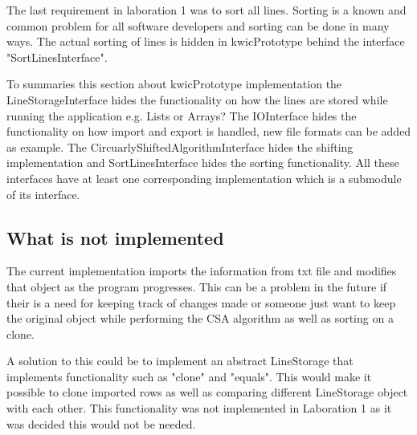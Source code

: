The last requirement in laboration 1 was to sort all lines. Sorting is a known and common
problem for all software developers and sorting can be done in many ways. The
actual sorting of lines is hidden in kwicPrototype behind the interface "SortLinesInterface".

To summaries this section about kwicPrototype implementation the LineStorageInterface
hides the functionality on how the lines are stored while running the application e.g. Lists or Arrays?
The IOInterface hides the functionality on how import and export is handled, new file
formats can be added as example. The CircuarlyShiftedAlgorithmInterface hides the
shifting implementation and SortLinesInterface hides the sorting functionality.
All these interfaces have at least one corresponding implementation which is a
submodule of its interface.

\subsection{What is not implemented}
The current implementation imports the information from txt file and modifies
that object as the program progresses. This can be a problem in the future
if their is a need for keeping track of changes made or someone just want to keep
the original object while performing the CSA algorithm as well as sorting on a
clone.

A solution to this could be to implement an abstract LineStorage that implements
functionality such as "clone" and "equals". This would make it possible to clone
imported rows as well as comparing different LineStorage object with each other.
This functionality was not implemented in Laboration 1 as it was decided this would not
be needed.
